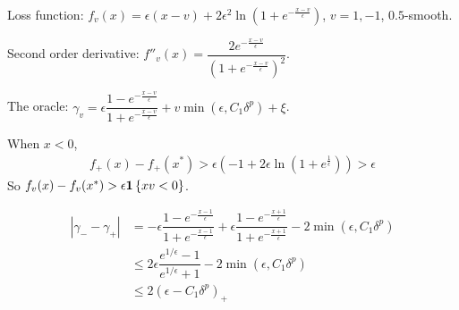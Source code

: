 \documentclass[11pt,letterpaper,english]{article}
\begin{document}
Loss function: $f_v(x) =\epsilon\left( x-v\right)+2\epsilon^2 \ln\left(1+e^{-\frac{x-v}{\epsilon}}  \right)$, $v= 1, -1$, $0.5$-smooth.

Second order derivative: $f''_v(x) = \dfrac{2e^{-\frac{x-v}{\epsilon}} }{\left(  1+e^{-\frac{x-v}{\epsilon}}\right)^2}$.

The oracle: $\gamma_v = \epsilon \dfrac{1-e^{-\frac{x-v}{\epsilon}}}{1+e^{-\frac{x-v}{\epsilon}}}+v \min \left( \epsilon, C_1 \delta^p \right)+\xi$.

When $x<0$, 
\begin{align*}
f_+(x)-f_+(x^*) >\epsilon\left( -1 +2\epsilon \ln\left( 1+e^{\frac{1}{\epsilon}} \right) \right)>\epsilon
\end{align*}
So $f_v(x)-f_v(x^*)>\epsilon \mathbf{1}\left\{x v  < 0\right\}$.

\begin{align*}
|\gamma_--\gamma_+| &= -\epsilon \dfrac{1-e^{-\frac{x-1}{\epsilon}}}{1+e^{-\frac{x-1}{\epsilon}}} + \epsilon \dfrac{1-e^{-\frac{x+1}{\epsilon}}}{1+e^{-\frac{x+1}{\epsilon}}}-2 \min \left( \epsilon, C_1 \delta^p \right)\\
&\leq 2\epsilon \dfrac{e^{1/\epsilon}-1}{e^{1/\epsilon}+1}-2 \min \left( \epsilon, C_1 \delta^p \right)\\
&\leq 2\left( \epsilon -C_1\delta^p \right)_+
\end{align*}
\end{document}
